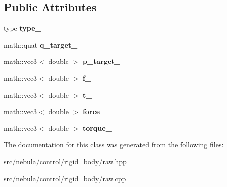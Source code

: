 \subsection*{Public Attributes}
\begin{DoxyCompactItemize}
\item 
\hypertarget{classneb_1_1control_1_1rigid__body_1_1raw_a8f5fb347a6c58f62b223c48a1813e2e4}{
type {\bfseries type\_\-}}
\label{classneb_1_1control_1_1rigid__body_1_1raw_a8f5fb347a6c58f62b223c48a1813e2e4}

\item 
\hypertarget{classneb_1_1control_1_1rigid__body_1_1raw_a472812f3800fc91527720e7922aa11f7}{
math::quat {\bfseries q\_\-target\_\-}}
\label{classneb_1_1control_1_1rigid__body_1_1raw_a472812f3800fc91527720e7922aa11f7}

\item 
\hypertarget{classneb_1_1control_1_1rigid__body_1_1raw_a65f9cf9ce195cef108adfdfca2f94478}{
math::vec3$<$ double $>$ {\bfseries p\_\-target\_\-}}
\label{classneb_1_1control_1_1rigid__body_1_1raw_a65f9cf9ce195cef108adfdfca2f94478}

\item 
\hypertarget{classneb_1_1control_1_1rigid__body_1_1raw_a1af8a9c496392f96a542964536a41f1f}{
math::vec3$<$ double $>$ {\bfseries f\_\-}}
\label{classneb_1_1control_1_1rigid__body_1_1raw_a1af8a9c496392f96a542964536a41f1f}

\item 
\hypertarget{classneb_1_1control_1_1rigid__body_1_1raw_a5a5814c383407852a180a03451aab534}{
math::vec3$<$ double $>$ {\bfseries t\_\-}}
\label{classneb_1_1control_1_1rigid__body_1_1raw_a5a5814c383407852a180a03451aab534}

\item 
\hypertarget{classneb_1_1control_1_1rigid__body_1_1raw_aa4ce0e8f719757e560c259b015f35200}{
math::vec3$<$ double $>$ {\bfseries force\_\-}}
\label{classneb_1_1control_1_1rigid__body_1_1raw_aa4ce0e8f719757e560c259b015f35200}

\item 
\hypertarget{classneb_1_1control_1_1rigid__body_1_1raw_aff9ff856531641609a94713bda40fef9}{
math::vec3$<$ double $>$ {\bfseries torque\_\-}}
\label{classneb_1_1control_1_1rigid__body_1_1raw_aff9ff856531641609a94713bda40fef9}

\end{DoxyCompactItemize}


The documentation for this class was generated from the following files:\begin{DoxyCompactItemize}
\item 
src/nebula/control/rigid\_\-body/raw.hpp\item 
src/nebula/control/rigid\_\-body/raw.cpp\end{DoxyCompactItemize}
